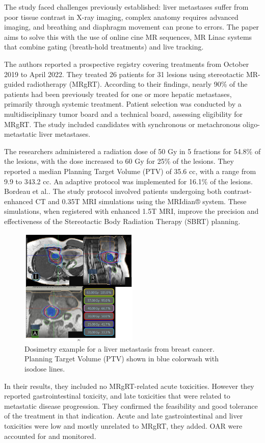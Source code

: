 The study faced challenges previously established: liver metastases suffer from poor tissue contrast in X-ray imaging, complex anatomy requires advanced imaging, and breathing and diaphragm movement can prone to errors. The paper aims to solve this with the use of online cine MR sequences, MR Linac systems that combine gating (breath-hold treatments) and live tracking.

The authors reported a prospective registry covering treatments from October 2019 to April 2022. They treated 26 patients for 31 lesions using stereotactic MR-guided radiotherapy (MRgRT). According to their findings, nearly 90\% of the patients had been previously treated for one or more hepatic metastases, primarily through systemic treatment. Patient selection was conducted by a multidisciplinary tumor board and a technical board, assessing eligibility for MRgRT. The study included candidates with synchronous or metachronous oligo-metastatic liver metastases.

The researchers administered a radiation dose of 50 Gy in 5 fractions for 54.8\% of the lesions, with the dose increased to 60 Gy for 25\% of the lesions. They reported a median Planning Target Volume (PTV) of 35.6 cc, with a range from 9.9 to 343.2 cc. An adaptive protocol was implemented for 16.1\% of the lesions. Bordeau et al.\cite{bordeau2023}. The study protocol involved patients undergoing both contrast-enhanced CT and 0.35T MRI simulations using the MRIdian® system. These simulations, when registered with enhanced 1.5T MRI, improve the precision and effectiveness of the Stereotactic Body Radiation Therapy (SBRT) planning.


\begin{figure}[H]
	\centering
	\includegraphics[width=0.5\textwidth]{assets/MRISBRT.jpeg}
	\caption{Dosimetry example for a liver metastasis from breast cancer. Planning Target Volume (PTV) shown in blue colorwash with isodose lines.\cite{bordeau2023}}
	\label{fig:liver-metastasis-dosimetry}
\end{figure}

In their results, they included no MRgRT-related acute toxicities. However they reported gastrointestinal toxicity, and late toxicities that were related to metastatic disease progression. They confirmed the feasibility and good tolerance of the treatment in that indication. Acute and late gastrointestinal and liver toxicities were low and mostly unrelated to MRgRT, they added. OAR were accounted for and monitored. 
